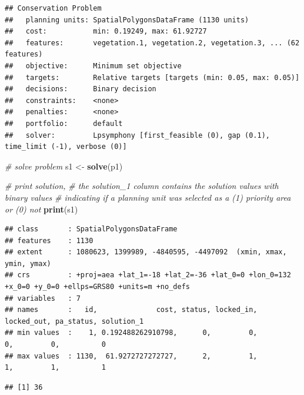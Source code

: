 \documentclass[12pt,]{book}
\newenvironment{Shaded}{\begin{snugshade}}{\end{snugshade}}
\newcommand{\KeywordTok}[1]{\textcolor[rgb]{0.13,0.29,0.53}{\textbf{#1}}}
\newcommand{\DecValTok}[1]{\textcolor[rgb]{0.00,0.00,0.81}{#1}}
\newcommand{\StringTok}[1]{\textcolor[rgb]{0.31,0.60,0.02}{#1}}
\newcommand{\CommentTok}[1]{\textcolor[rgb]{0.56,0.35,0.01}{\textit{#1}}}
\newcommand{\OperatorTok}[1]{\textcolor[rgb]{0.81,0.36,0.00}{\textbf{#1}}}
\newcommand{\NormalTok}[1]{#1}
\begin{document}
\begin{verbatim}
## Conservation Problem
##   planning units: SpatialPolygonsDataFrame (1130 units)
##   cost:           min: 0.19249, max: 61.92727
##   features:       vegetation.1, vegetation.2, vegetation.3, ... (62 features)
##   objective:      Minimum set objective 
##   targets:        Relative targets [targets (min: 0.05, max: 0.05)]
##   decisions:      Binary decision 
##   constraints:    <none>
##   penalties:      <none>
##   portfolio:      default
##   solver:         Lpsymphony [first_feasible (0), gap (0.1), time_limit (-1), verbose (0)]
\end{verbatim}

\begin{Shaded}
\begin{Highlighting}[]
\CommentTok{# solve problem}
\NormalTok{s1 <-}\StringTok{ }\KeywordTok{solve}\NormalTok{(p1)}

\CommentTok{# print solution,}
\CommentTok{# the solution_1 column contains the solution values with binary values}
\CommentTok{# indicating if a planning unit was selected as a (1) priority area or (0) not}
\KeywordTok{print}\NormalTok{(s1)}
\end{Highlighting}
\end{Shaded}

\begin{verbatim}
## class       : SpatialPolygonsDataFrame 
## features    : 1130 
## extent      : 1080623, 1399989, -4840595, -4497092  (xmin, xmax, ymin, ymax)
## crs         : +proj=aea +lat_1=-18 +lat_2=-36 +lat_0=0 +lon_0=132 +x_0=0 +y_0=0 +ellps=GRS80 +units=m +no_defs 
## variables   : 7
## names       :   id,              cost, status, locked_in, locked_out, pa_status, solution_1 
## min values  :    1, 0.192488262910798,      0,         0,          0,         0,          0 
## max values  : 1130,  61.9272727272727,      2,         1,          1,         1,          1
\end{verbatim}

\begin{Shaded}
\end{Shaded}

\begin{verbatim}
## [1] 36
\end{verbatim}
\end{document}

